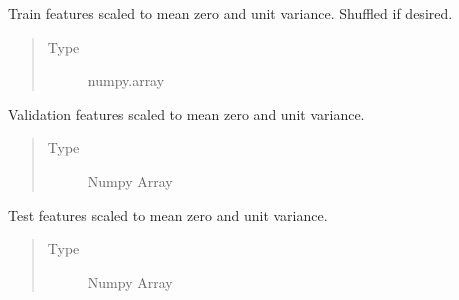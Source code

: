\documentclass[a4paper,10pt,english]{sphinxmanual}
\begin{document}
\begin{fulllineitems}
\begin{fulllineitems}
\begin{quote}
\begin{description}
\end{description}\end{quote}

\end{fulllineitems}


\begin{fulllineitems}
\label{\detokenize{api/ucf.TrainingDataSets:ucf.TrainingDataSets.scaled_train_features}}
Train features scaled to mean zero and unit variance. Shuffled
if desired.
\begin{quote}\begin{description}
\item[{Type}] \leavevmode
numpy.array

\end{description}\end{quote}

\end{fulllineitems}


\begin{fulllineitems}
\label{\detokenize{api/ucf.TrainingDataSets:ucf.TrainingDataSets.scaled_validation_features}}
Validation features scaled to mean zero and unit variance.
\begin{quote}\begin{description}
\item[{Type}] \leavevmode
Numpy Array

\end{description}\end{quote}

\end{fulllineitems}


\begin{fulllineitems}
\label{\detokenize{api/ucf.TrainingDataSets:ucf.TrainingDataSets.scaled_test_features}}
Test features scaled to mean zero and unit variance.
\begin{quote}\begin{description}
\item[{Type}] \leavevmode
Numpy Array


\end{description}
\end{quote}
\end{fulllineitems}
\end{fulllineitems}
\end{document}
